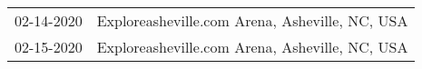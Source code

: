 \begin{supertabular}{ll}
 02-14-2020 &  Exploreasheville.com Arena, Asheville, NC, USA \\
 02-15-2020 &  Exploreasheville.com Arena, Asheville, NC, USA \\
\end{supertabular}
